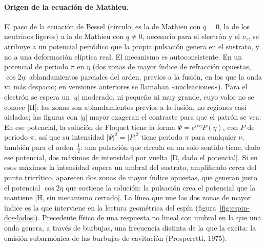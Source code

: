 \documentclass[11pt,a4paper]{article}
\newcommand{\st}[1]{\textup{[#1]}}
\newcommand{\apartado}[1]{\paragraph{#1}}
\begin{document}
\apartado{Origen de la ecuación de Mathieu.} El paso de la ecuación de Bessel (círculo; es la de Mathieu con $q=0$, la de los neutrinos ligeros) a la de Mathieu con $q\neq0$, necesario para el electrón y el $\nu_\tau$, se atribuye a un potencial periódico que la propia pulsación genera en el sustrato, y no a una deformación elíptica real. El mecanismo es autoconsistente. En un potencial de periodo $\pi$ en $\eta$ (dos zonas de mayor índice de refracción opuestas, $\cos2\eta$: ablandamientos parciales del orden, previos a la fusión, en los que la onda va más despacio; en versiones anteriores se llamaban «nucleaciones»). Para el electrón se espera un $|q|$ moderado, ni pequeño ni muy grande, cuyo valor no se conoce \st{H}: las zonas son ablandamientos previos a la fusión, no regiones casi aisladas; las figuras con $|q|$ mayor exageran el contraste para que el patrón se vea. En ese potencial, la solución de Floquet tiene la forma $\Psi=e^{i\nu\eta}P(\eta)$, con $P$ de periodo $\pi$, así que su intensidad $|\Psi|^2=|P|^2$ tiene periodo $\pi$ para cualquier $\nu$, también para el orden~$\tfrac12$: una pulsación que circula en un solo sentido tiene, dado ese potencial, dos máximos de intensidad por vuelta \st{D, dado el potencial}. Si en esos máximos la intensidad supera un umbral del sustrato, amplificado cerca del punto tricrítico, aparecen dos zonas de mayor índice opuestas, que generan justo el potencial $\cos2\eta$ que sostiene la solución: la pulsación crea el potencial que la mantiene \st{H, sin mecanismo cerrado}. La línea que une las dos zonas de mayor índice es la que interviene en la lectura geométrica del espín (figura~\ref{fig:espin-dos-lados}). Precedente físico de una respuesta no lineal con umbral en la que una onda genera, a través de burbujas, una frecuencia distinta de la que la excita: la emisión subarmónica de las burbujas de cavitación (Prosperetti, 1975).
\end{document}
